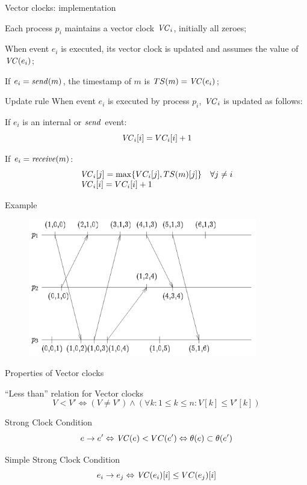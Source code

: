 \begin{frame}{Vector clocks: implementation}
\BI
\item Each process $p_i$ maintains a vector clock $\mathit{VC}_i$, initially all zeroes;
\item When event $e_i$ is executed, its vector clock is updated and assumes the value of $\mathit{VC}(e_i)$;
\item If $e_i = \mathit{send}(m)$, the timestamp of $m$ is $TS(m) = \mathit{VC}(e_i)$;
\EI

\bigskip
\begin{block}{Update rule}
When event $e_i$ is executed by process $p_i$, $\mathit{VC}_i$ is updated as follows:
\BI
  \item If $e_i$ is an internal or $\mathit{send}$ event: 
\[
  \mathit{VC}_i[i] = VC_i[i] + 1
\]
  \item If $e_i = \mathit{receive}(m)$: \\
\[
  \begin{array}{ll}
    \mathit{VC}_i[j] = \max \{ VC_i[j], TS(m)[j] \}  & \forall j \neq i \\
    \mathit{VC}_i[i] = VC_i[i] + 1
  \end{array} 
\]
\EI
\end{block}
\end{frame}

\begin{frame}{Example}
\begin{figure} 
\includegraphics[width=10cm]{figs/02/figure-7}
\end{figure}
\end{frame}

\begin{frame}{Properties of Vector clocks}

\begin{block}{``Less than'' relation for Vector clocks}
\[
  V < V' \Leftrightarrow (V \neq V') \wedge (\forall k: 1 \leq k \leq n: V[k] \leq V'[k])
\]
\end{block}

\begin{block}{Strong Clock Condition}
\[
  e \rightarrow e' \Leftrightarrow \mathit{VC}(e) < VC(e') \Leftrightarrow \theta(e) \subset \theta(e')
\]
\end{block}

\begin{block}{Simple Strong Clock Condition}
\[
  e_i \rightarrow e_j \Leftrightarrow \mathit{VC}(e_i)[i] \leq VC(e_j)[i]
\]
\end{block}

\end{frame}



